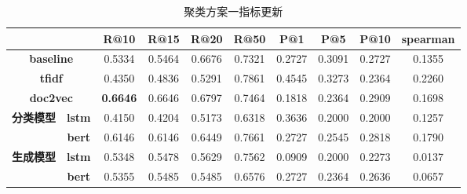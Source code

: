\documentclass[11pt]{article}
\begin{document}
\begin{CJK}{UTF8}{gkai}
\begin{itemize}
\begin{itemize}
  \end{itemize}
\end{itemize}

\begin{table}[htbp]
  \centering
  \begin{tabular}{c|c|c|c|c|c|c|c|c|c}
    \hline
    \multicolumn{2}{c|}{} & \multicolumn{1}{c}{\textbf{R@10}} & \multicolumn{1}{c}{\textbf{R@15}} & \multicolumn{1}{c|}{\textbf{R@20}} & \multicolumn{1}{c}{\textbf{R@50}} & \multicolumn{1}{c}{\textbf{P@1}} & \multicolumn{1}{c}{\textbf{P@5}} & \multicolumn{1}{c}{\textbf{P@10}} & \multicolumn{1}{c}{\textbf{spearman}} \\
    \hline
    \multicolumn{2}{c|}{\textbf{baseline}} & 0.5334  & 0.5464  & 0.6676  & 0.7321  & 0.2727  & 0.3091  & 0.2727  & 0.1355  \\
    \hline
    \multicolumn{2}{c|}{\textbf{tfidf}} & 0.4350  & 0.4836  & 0.5291  & 0.7861  & 0.4545  & 0.3273  & 0.2364  & 0.2260  \\
    \hline
    \multicolumn{2}{c|}{\textbf{doc2vec}} & \textcolor[rgb]{ 1,  0,  0}{\textbf{0.6646 }} & 0.6646  & 0.6797  & 0.7464  & 0.1818  & 0.2364  & 0.2909  & 0.1698  \\
    \hline
    \multirow{2}[0]{*}{\textbf{分类模型}} & \textbf{lstm} & 0.4150  & 0.4204  & 0.5173  & 0.6318  & 0.3636  & 0.2000  & 0.2000  & 0.1257  \\
    & \textbf{bert} & 0.6146  & 0.6146  & 0.6449  & 0.7661  & 0.2727  & 0.2545  & 0.2818  & 0.1790  \\
    \hline
    \multirow{2}[0]{*}{\textbf{生成模型}} & \textbf{lstm} & 0.5348  & 0.5478  & 0.5629  & 0.7562  & 0.0909  & 0.2000  & 0.2273  & 0.0137  \\
    & \textbf{bert} & 0.5355  & 0.5485  & 0.5485  & 0.6576  & 0.2727  & 0.2364  & 0.2636  & 0.0657  \\
    \hline
  \end{tabular}%
  \caption{聚类方案一指标更新}
  \label{tab:addlabel}%
\end{table}%



\end{CJK}
\end{document}
